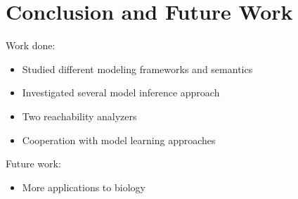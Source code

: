 \chapter{Conclusion and Future Work}\label{chap:conclusion}
Work done:
\begin{itemize}
    \item Studied different modeling frameworks and semantics
    \item Investigated several model inference approach
    \item Two reachability analyzers
    \item Cooperation with model learning approaches
\end{itemize}

Future work:
\begin{itemize}
    \item More applications to biology
\end{itemize}